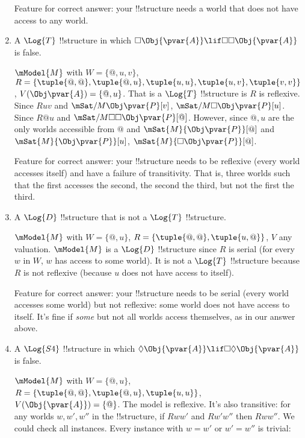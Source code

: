 \documentclass[../../../include/open-logic-section]{subfiles}
\begin{document}
\begin{prob}
\begin{ans}
\begin{enumerate}
        Feature for correct answer: your !!{structure} needs a world
        that does not have access to any world.
        
        \item A $\Log{T}$ !!{structure} in which
        $\Box\Obj{\pvar{A}}\lif\Box\Box\Obj{\pvar{A}}$ is false.

        $\mModel{M}$ with $W=\{@,u,v\}$,
        $R=\{\tuple{@,@},\tuple{@,u},\tuple{u,u},\tuple{u,v},
        \tuple{v,v}\}$, $V(\Obj\pvar{A})=\{@,u\}$. That is a $\Log{T}$
        !!{structure} is $R$ is reflexive. Since $Ruv$ and
        $\mSat/{M}{\Obj\pvar{P}}[v]$,
        $\mSat/{M}{\Box\Obj\pvar{P}}[u]$. Since $R@u$ and
        $\mSat/{M}{\Box\Box\Obj\pvar{P}}[@]$. However, since $@,u$ are
        the only worlds accessible from $@$ and
        $\mSat{M}{\Obj\pvar{P}}[@]$ and $\mSat{M}{\Obj\pvar{P}}[u]$,
        $\mSat{M}{\Box\Obj\pvar{P}}[@]$.

        Feature for correct answer: your !!{structure} needs to be 
        reflexive (every world accesses itself) and have a failure of 
        transitivity. That is, three worlds such that the first 
        accesses the second, the second the third, but not the first
        the third. 

        \item A $\Log{D}$ !!{structure} that is not a $\Log{T}$
        !!{structure}.

        $\mModel{M}$ with $W=\{@,u\}$,
        $R=\{\tuple{@,@},\tuple{u,@}\}$, $V$ any valuation.
        $\mModel{M}$ is a $\Log{D}$ !!{structure} since $R$ is serial
        (for every $w$ in $W$, $w$ has access to some world). It is
        not a $\Log{T}$ !!{structure} because $R$ is not reflexive
        (because $u$ does not have access to itself).
        
        Feature for correct answer: your !!{structure} needs to be serial 
        (every world accesses some world) but not reflexive: some 
        world does not have access to itself. It's fine if \emph{some}
        but not all worlds access themselves, as in our answer above.

        \item A $\Log{S4}$ !!{structure} in which
        $\Diamond\Obj{\pvar{A}}\lif\Box\Diamond\Obj{\pvar{A}}$ is
        false.

        $\mModel{M}$ with $W=\{@,u\}$,
        $R=\{\tuple{@,@},\tuple{@,u},\tuple{u,u}\}$, 
        $V(\Obj{\pvar{A}})=\{@\}$.
        The model is reflexive. It's also transitive: for any worlds 
        $w,w',w''$ in the !!{structure}, if $Rww'$ and $Rw'w''$
        then $Rww''$. We could check all instances. Every instance 
        with $w=w'$ or $w'=w''$ is trivial:


\end{enumerate}
\end{ans}
\end{prob}
\end{document}
